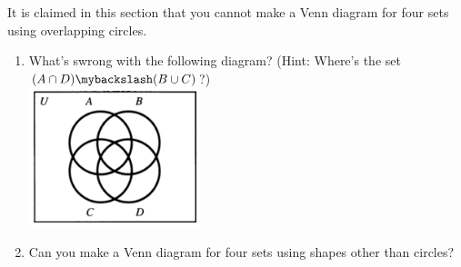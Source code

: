 It is claimed in this section that you cannot make a Venn diagram for four sets using overlapping circles.
\begin{enumerate}[label=(\alph*)]
    \item What's swrong with the following diagram? (Hint: Where's the set $(A \cap D) \mybackslash (B \cup C)$?) \\
    \includegraphics[width=5cm]{./4-Figure.png} \\    
    \item Can you make a Venn diagram for four sets using shapes other than circles?
\end{enumerate}

